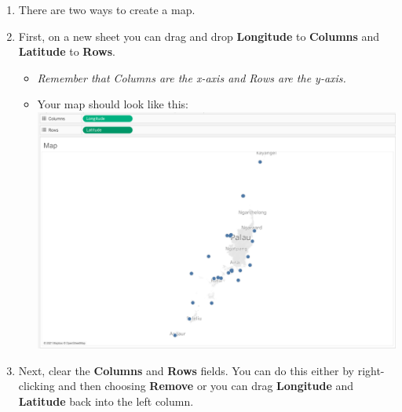 \documentclass[
]{book}
\providecommand{\tightlist}{%
  \setlength{\itemsep}{0pt}\setlength{\parskip}{0pt}}
\begin{document}
\begin{enumerate}
\def\labelenumi{\arabic{enumi}.}
\tightlist
\item
  There are two ways to create a map.
\item
  First, on a new sheet you can drag and drop \textbf{Longitude} to \textbf{Columns} and \textbf{Latitude} to \textbf{Rows}.

  \begin{itemize}
  \tightlist
  \item
    \emph{Remember that Columns are the x-axis and Rows are the y-axis.}\\
  \item
    Your map should look like this:
    \includegraphics{images/M3S2_map-1.png}
  \end{itemize}
\item
  Next, clear the \textbf{Columns} and \textbf{Rows} fields. You can do this either by right-clicking and then choosing \textbf{Remove} or you can drag \textbf{Longitude} and \textbf{Latitude} back into the left column.
\end{enumerate}
\end{document}
